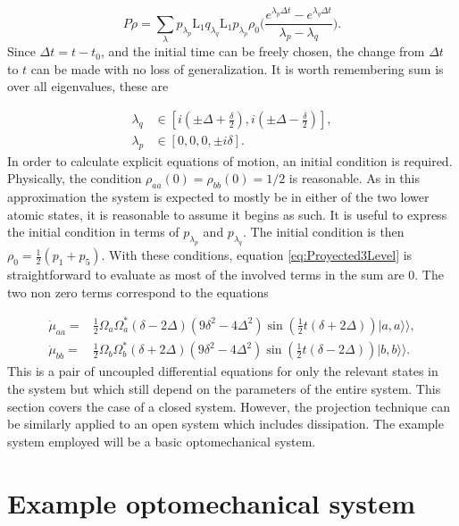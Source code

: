 \documentclass[12pt]{article}
\newcommand{\superket}[1]{|#1\rangle\rangle}
\begin{document}
\begin{equation}\label{eq:Proyected3Level}
    P\dot{\rho}=\sum_{\lambda} p_{\lambda_p} \mathrm{L}_1  q_{\lambda_q}\mathrm{L}_1p_{\lambda_p} \rho_0\Bigg(\frac{e^{\lambda_p\Delta t}-e^{\lambda_q \Delta t}}{\lambda_p-\lambda_q}\Bigg).
\end{equation} Since $\Delta t=t-t_0$, and the initial time can be freely chosen, the change from $\Delta t$ to $t$ can be made with no loss of generalization. It is worth remembering sum is over all eigenvalues, these are

\begin{align*}
    \lambda_q &\in [ i(\pm\Delta+\frac{\delta}{2}), i(\pm\Delta - \frac{\delta}{2} )],\\
    \lambda_p &\in [0,0,0, \pm i\delta].
\end{align*} In order to calculate explicit equations of motion, an initial condition is required. Physically, the condition $\rho_{aa}(0)=\rho_{bb}(0)=1/2$ is reasonable. As in this approximation the system is expected to mostly be in either of the two lower atomic states, it is reasonable to assume it begins as such. It is useful to express the initial condition in terms of $p_{\lambda_p}$ and $p_{\lambda_q}$. The initial condition is then $\rho_0=\frac{1}{2}(p_{1}+p_{5})$. With these conditions, equation \eqref{eq:Proyected3Level} is straightforward to evaluate as most of the involved terms in the sum are 0. The two non zero terms correspond to the equations

\begin{align*}
    \dot{\mu}_{aa}=&\frac{1}{2} \Omega_a \Omega_a^* (\delta-2 \Delta) \left(9 \delta^2-4 \Delta^2\right) \sin \left(\frac{1}{2} t (\delta+2 \Delta)\right)\superket{a,a},\\
    \dot{\mu}_{bb}=&\frac{1}{2} \Omega_b \Omega_b^* (\delta+2 \Delta) \left(9 \delta^2-4 \Delta^2\right) \sin \left(\frac{1}{2} t (\delta-2 \Delta)\right)\superket{b,b}.
\end{align*} This is a pair of uncoupled differential equations for only the relevant states in the system but which still depend on the parameters of the entire system. This section covers the case of a closed system. However, the projection technique can be similarly applied to an open system which includes dissipation. The example system employed will be a basic optomechanical system.



\section{Example optomechanical system}\label{sec:ExampleSystem}
\end{document}
